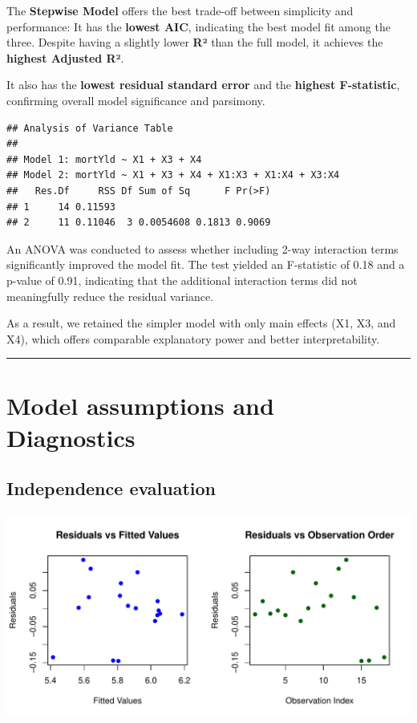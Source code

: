 \documentclass[
  11pt,
]{article}
\begin{document}
The \textbf{Stepwise Model} offers the best trade-off between simplicity
and performance: It has the \textbf{lowest AIC}, indicating the best
model fit among the three. Despite having a slightly lower \textbf{R²}
than the full model, it achieves the \textbf{highest Adjusted R²}.

It also has the \textbf{lowest residual standard error} and the
\textbf{highest F-statistic}, confirming overall model significance and
parsimony.

\begin{verbatim}
## Analysis of Variance Table
## 
## Model 1: mortYld ~ X1 + X3 + X4
## Model 2: mortYld ~ X1 + X3 + X4 + X1:X3 + X1:X4 + X3:X4
##   Res.Df     RSS Df Sum of Sq      F Pr(>F)
## 1     14 0.11593                           
## 2     11 0.11046  3 0.0054608 0.1813 0.9069
\end{verbatim}

An ANOVA was conducted to assess whether including 2-way interaction
terms significantly improved the model fit. The test yielded an
F-statistic of 0.18 and a p-value of 0.91, indicating that the
additional interaction terms did not meaningfully reduce the residual
variance.

As a result, we retained the simpler model with only main effects (X1,
X3, and X4), which offers comparable explanatory power and better
interpretability.

\begin{center}\rule{0.5\linewidth}{0.5pt}\end{center}

\section{Model assumptions and
Diagnostics}\label{model-assumptions-and-diagnostics}

\subsection{Independence evaluation}\label{independence-evaluation}

\includegraphics{Figs/unnamed-chunk-15-1.pdf}
\end{document}
